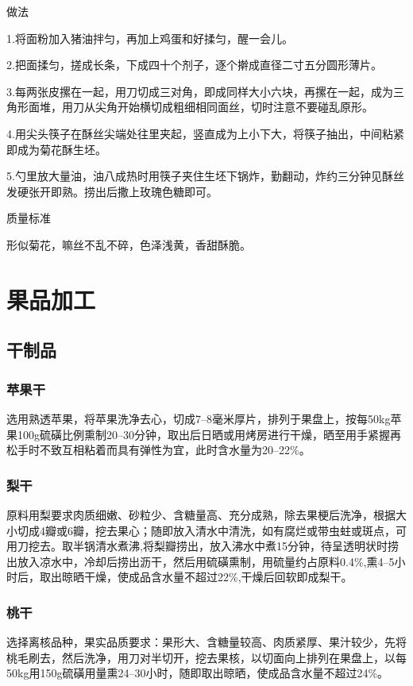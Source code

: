 \documentclass{ctexbook}
\begin{document}
做法

1.将面粉加入猪油拌匀，再加上鸡蛋和好揉匀，醒一会儿。

2.把面揉匀，搓成长条，下成四十个剂子，逐个擀成直径二寸五分圆形薄片。

3.每两张皮摞在一起，用刀切成三对角，即成同样大小六块，再摞在一起，成为三角形面堆，用刀从尖角开始横切成粗细相同面丝，切时注意不要碰乱原形。

4.用尖头筷子在酥丝尖端处往里夹起，竖直成为上小下大，将筷子抽出，中间粘紧即成为菊花酥生坯。

5.勺里放大量油，油八成热时用筷子夹住生坯下锅炸，勤翻动，炸约三分钟见酥丝发硬张开即熟。捞出后撒上玫瑰色糖即可。

质量标准

形似菊花，嘛丝不乱不碎，色泽浅黄，香甜酥脆。





                  
                  
                  
                  
                  
\chapter{果品加工}
\section{干制品}
\subsection{苹果干}
选用熟透苹果，将苹果洗净去心，切成7--8毫米厚片，排列于果盘上，按每50kg苹果100g硫磺比例熏制20--30分钟，取出后日晒或用烤房进行干燥，晒至用手紧握再松手时不致互相粘着而具有弹性为宜，此时含水量为20--22\%。
\subsection{梨干}
原料用梨要求肉质细嫩、砂粒少、含糖量高、充分成熟，除去果梗后洗净，根据大小切成4瓣或6瓣，挖去果心；随即放入清水中清洗，如有腐烂或带虫蛀或斑点，可用刀挖去。取半锅清水煮沸,将梨瓣捞出，放入沸水中煮15分钟，待呈透明状时捞出放入凉水中，冷却后捞出沥干，然后用硫磺熏制，用硫量约占原料0.4\%,熏4--5小时后，取出晾晒干燥，使成品含水量不超过22\%,干燥后回软即成梨干。
\subsection{桃干}
选择离核品种，果实品质要求：果形大、含糖量较高、肉质紧厚、果汁较少，先将桃毛刷去，然后洗净，用刀对半切开，挖去果核，以切面向上排列在果盘上，以每50kg用150g硫磺用量熏24--30小时，随即取出晾晒，使成品含水量不超过24\%。
\end{document}
